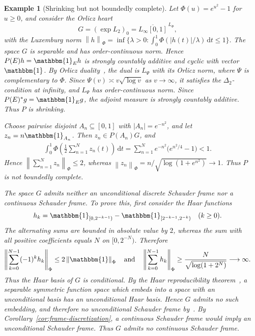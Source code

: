 \documentclass[11pt,leqno]{amsart}
\theoremstyle{compact}
\numberwithin{equation}{section}
\theoremstyle{compactremark}
\newtheorem{example}[theorem]{Example}
\theoremstyle{compact}
\newcommand{\1}{\mathbbm{1}}
\newcommand{\rmd}{\mathrm{d}}
\newcommand{\norm}[1]{\left\|#1\right\|}
\newcommand{\abs}[1]{\left|#1\right|}
\begin{document}
\begin{example}[Shrinking but not boundedly complete]\label{ex:orlicz-james}
Let $\Phi(u)=e^{u^2}-1$ for $u\geq0$, and consider the Orlicz heart
\[
G=(\exp L_2)_0=\overline{L_\infty[0,1]}^{\,L_\Phi},
\]
with the Luxemburg norm $\norm{h}_\Phi=\inf\{\lambda>0:\int_0^1\Phi(\abs{h(t)}/\lambda)\,\rmd t\leq1\}$. The space $G$ is separable and has order-continuous norm. Hence $P(E)h=\1_Eh$ is strongly countably additive and cyclic with vector $\1$. By Orlicz duality~\cite{LindenstraussTzafriri1979}, the dual is $L_\Psi$ with its Orlicz norm, where $\Psi$ is complementary to $\Phi$. Since $\Psi(v)\asymp v\sqrt{\log v}$ as $v\to\infty$, it satisfies the $\Delta_2$-condition at infinity, and $L_\Psi$ has order-continuous norm. Since $P(E)^*g=\1_Eg$, the adjoint measure is strongly countably additive. Thus $P$ is shrinking.

Choose pairwise disjoint $A_n\subseteq[0,1]$ with $\abs{A_n}=e^{-n^2}$, and let $z_n=n\1_{A_n}$. Then $z_n\in P(A_n)G$, and
\begin{align*}
\int_0^1\Phi\left(\frac{1}{2}\sum_{n=1}^Nz_n(t)\right)\,\rmd t
=\sum_{n=1}^Ne^{-n^2}\bigl(e^{n^2/4}-1\bigr)<1.
\end{align*}
Hence $\norm{\sum_{n=1}^Nz_n}_\Phi\leq2$, whereas $\norm{z_n}_\Phi=n/\sqrt{\log(1+e^{n^2})}\to1$. Thus $P$ is not boundedly complete.

The space $G$ admits neither an unconditional discrete Schauder frame nor a continuous Schauder frame. To prove this, first consider the Haar functions
\[
h_k=\1_{[0,2^{-k-1})}-\1_{[2^{-k-1},2^{-k})}\quad(k\geq0).
\]
The alternating sums are bounded in absolute value by $2$, whereas the sum with all positive coefficients equals $N$ on $[0,2^{-N})$. Therefore
\begin{align*}
\norm{\sum_{k=0}^{N-1}(-1)^kh_k}_\Phi
\leq2\norm{\1}_\Phi\quad\text{and}\quad
\norm{\sum_{k=0}^{N-1}h_k}_\Phi
\geq\frac{N}{\sqrt{\log(1+2^N)}}\longrightarrow\infty.
\end{align*}
Thus the Haar basis of $G$ is conditional. By the Haar reproducibility theorem~\cite[Theorem~2.c.8]{LindenstraussTzafriri1979}, a separable symmetric function space which embeds into a space with an unconditional basis has an unconditional Haar basis. Hence $G$ admits no such embedding, and therefore no unconditional Schauder frame by~\cite[Proposition~1.6]{HanLarsonLiuLiu2014}. By Corollary~\ref{cor:frame-discretization}, a continuous Schauder frame would imply an unconditional Schauder frame. Thus $G$ admits no continuous Schauder frame.
\end{example}
\end{document}
